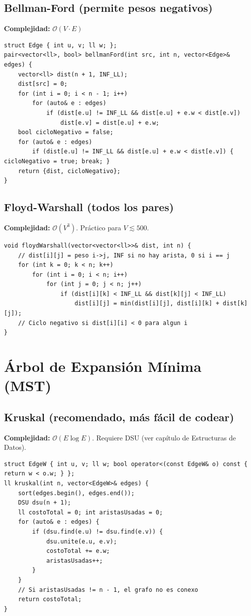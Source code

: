 \documentclass[10pt,twocolumn,letterpaper]{report}
\begin{document}
\subsection{Bellman-Ford (permite pesos negativos)}
\textbf{Complejidad:} $\mathcal{O}(V \cdot E)$
\begin{lstlisting}
struct Edge { int u, v; ll w; };
pair<vector<ll>, bool> bellmanFord(int src, int n, vector<Edge>& edges) {
    vector<ll> dist(n + 1, INF_LL);
    dist[src] = 0;
    for (int i = 0; i < n - 1; i++)
        for (auto& e : edges)
            if (dist[e.u] != INF_LL && dist[e.u] + e.w < dist[e.v])
                dist[e.v] = dist[e.u] + e.w;
    bool cicloNegativo = false;
    for (auto& e : edges)
        if (dist[e.u] != INF_LL && dist[e.u] + e.w < dist[e.v]) { cicloNegativo = true; break; }
    return {dist, cicloNegativo};
}
\end{lstlisting}

\subsection{Floyd-Warshall (todos los pares)}
\textbf{Complejidad:} $\mathcal{O}(V^3)$. Práctico para $V \lesssim 500$.
\begin{lstlisting}
void floydWarshall(vector<vector<ll>>& dist, int n) {
    // dist[i][j] = peso i->j, INF si no hay arista, 0 si i == j
    for (int k = 0; k < n; k++)
        for (int i = 0; i < n; i++)
            for (int j = 0; j < n; j++)
                if (dist[i][k] < INF_LL && dist[k][j] < INF_LL)
                    dist[i][j] = min(dist[i][j], dist[i][k] + dist[k][j]);
    // Ciclo negativo si dist[i][i] < 0 para algun i
}
\end{lstlisting}

\section{Árbol de Expansión Mínima (MST)}

\subsection{Kruskal (recomendado, más fácil de codear)}
\textbf{Complejidad:} $\mathcal{O}(E \log E)$. Requiere DSU (ver capítulo de Estructuras de Datos).
\begin{lstlisting}
struct EdgeW { int u, v; ll w; bool operator<(const EdgeW& o) const { return w < o.w; } };
ll kruskal(int n, vector<EdgeW>& edges) {
    sort(edges.begin(), edges.end());
    DSU dsu(n + 1);
    ll costoTotal = 0; int aristasUsadas = 0;
    for (auto& e : edges) {
        if (dsu.find(e.u) != dsu.find(e.v)) {
            dsu.unite(e.u, e.v);
            costoTotal += e.w;
            aristasUsadas++;
        }
    }
    // Si aristasUsadas != n - 1, el grafo no es conexo
    return costoTotal;
}
\end{lstlisting}
\end{document}
